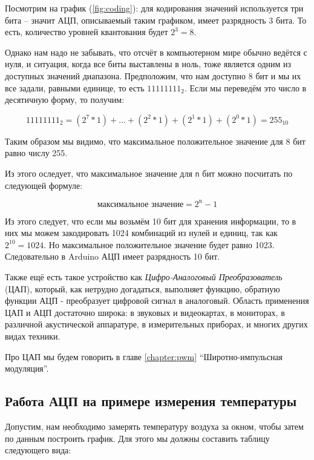 \documentclass[../sparc.tex]{subfiles}
\begin{document}
Посмотрим на график (\ref{fig:coding}): для кодирования значений используется
три бита -- значит АЦП, описываемый таким графиком, имеет разрядность 3 бита.  То
есть, количество уровней квантования будет $2^3 = 8$.

Однако нам надо не забывать, что отсчёт в компьютерном мире обычно ведётся с
нуля, и ситуация, когда все биты выставлены в ноль, тоже является одним из
доступных значений диапазона.  Предположим, что нам доступно 8 бит и мы их все
задали, равными единице, то есть $11111111_2$.  Если мы переведём это число в
десятичную форму, то получим:

\begin{equation}
  11111111_2 = (2^7 * 1) + \mbox{...} + (2^2 * 1) + (2^1 * 1) + (2^0 * 1) = 255_{10}
\end{equation}

Таким образом мы видимо, что максимальное положительное значение для 8 бит равно
числу 255.

Из этого оследует, что максимальное значение для \texttt{n} бит можно посчитать
по следующей формуле:

\begin{equation}
  \mbox{максимальное значение} = 2^{\mbox{n}} - 1
\end{equation}

Из этого следует, что если мы возьмём 10 бит для хранения информации, то в них
мы можем закодировать 1024 комбинаций из нулей и единиц, так как $2^{10} =
1024$.  Но максимальное положительное значение будет равно 1023.  Следовательно
в Arduino АЦП имеет разрядность 10 бит.

Также ещё есть такое устройство как \emph{Цифро-Аналоговый Преобразователь}
(\gls{ЦАП}), который, как нетрудно догадаться, выполняет функцию, обратную
функции АЦП - преобразует цифровой сигнал в аналоговый.  Область применения ЦАП
и АЦП достаточно широка: в звуковых и видеокартах, в мониторах, в различной
акустической аппаратуре, в измерительных приборах, и многих других видах
техники.

Про ЦАП мы будем говорить в главе \ref{chapter:pwm} ``Широтно-импульсная
модуляция''.

\subsection{Работа АЦП на примере измерения температуры}
\label{subsection:adc-temperature-example}

Допустим, нам необходимо замерять температуру воздуха за окном, чтобы затем по
данным построить график.  Для этого мы должны составить таблицу следующего вида:
\end{document}
